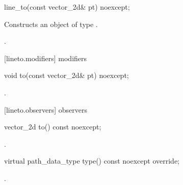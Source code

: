 \begin{itemdecl}
    line_to(const vector_2d& pt) noexcept;
\end{itemdecl}
\begin{itemdescr}
	\pnum
	\effects
	Constructs an object of type .
	
	\pnum
	\postconditions
	.
\end{itemdescr}

 [lineto.modifiers]{ modifiers}

\begin{itemdecl}
    void to(const vector_2d& pt) noexcept;
\end{itemdecl}
\begin{itemdescr}
	\pnum
	\postconditions
	.
	
\end{itemdescr}

 [lineto.observers]{ observers}

\begin{itemdecl}
    vector_2d to() const noexcept;
\end{itemdecl}
\begin{itemdescr}
	\pnum
	\returns
	.

\end{itemdescr}

\begin{itemdecl}
    virtual path_data_type type() const noexcept override;
\end{itemdecl}
\begin{itemdescr}
	\pnum
	\returns
	.

\end{itemdescr}
